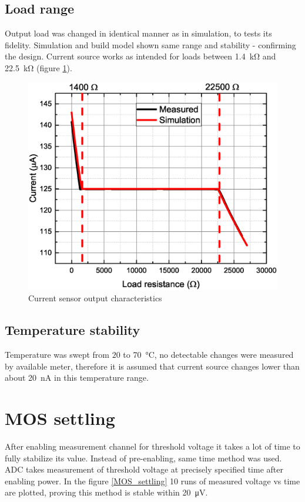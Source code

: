     \subsection{Load range}
        Output load was changed in identical manner as in simulation, to tests its fidelity. Simulation and build model shown same range and stability - confirming the design. Current source works as intended for loads between \SI{1.4}{\kilo\ohm} and \SI{22.5}{\kilo\ohm} (figure \ref{Current_sensor_output_characteristics}).
        \begin{figure}[H]
            \centering
            \includegraphics[width=0.9\paperwidth]{img/07/output_resistance.eps}
            \caption{Current sensor output characteristics}
            \label{Current_sensor_output_characteristics}
        \end{figure}

    \subsection{Temperature stability}
        Temperature was swept from $20$ to \SI{70}{\degreeCelsius}, no detectable changes were measured by available meter, therefore it is assumed that current source changes lower than about \SI{20}{\nano\ampere} in this temperature range.

\section{MOS settling}
    After enabling measurement channel for threshold voltage it takes a lot of time to fully stabilize its value. Instead of pre-enabling, same time method was used. ADC takes measurement of threshold voltage at precisely specified time after enabling power. In the figure \ref{MOS_settling} 10 runs of measured voltage vs time are plotted, proving this method is stable within \SI{20}{\uV}.

